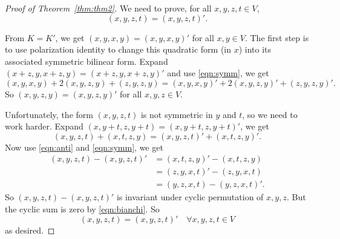 \documentclass[12pt]{article}
\begin{document}
\begin{proof}[Proof of Theorem~\ref{thm:thm2}]
We need to prove, for all $x,y,z,t\in V$,
\[
(x,y,z,t)=(x,y,z,t)'.
\]

From $K=K'$, we get $(x,y,x,y)=(x,y,x,y)'$ for all $x,y\in V$.  The first step is to use polarization identity to change this quadratic form (in $x$) into its associated symmetric bilinear form.  Expand $(x+z,y,x+z,y)=(x+z,y,x+z,y)'$ and use \eqref{eqn:symm}, we get
\[
(x,y,x,y)+2(x,y,z,y)+(z,y,z,y)=(x,y,x,y)'+2(x,y,z,y)'+(z,y,z,y)'.
\]
So $(x,y,z,y)=(x,y,z,y)'$ for all $x,y,z\in V$.

Unfortunately, the form $(x,y,z,t)$ is not symmetric in $y$ and $t$, so we need to work harder.  Expand $(x,y+t,z,y+t)=(x,y+t,z,y+t)'$, we get
\[
(x,y,z,t)+(x,t,z,y)=(x,y,z,t)'+(x,t,z,y)'.
\]
Now use \eqref{eqn:anti} and \eqref{eqn:symm}, we get
\begin{align*}
(x,y,z,t)-(x,y,z,t)'&=(x,t,z,y)'-(x,t,z,y)\\
&=(z,y,x,t)'-(z,y,x,t)\\
&=(y,z,x,t)-(y,z,x,t)'.
\end{align*}
So $(x,y,z,t)-(x,y,z,t)'$ is invariant under cyclic permutation of $x,y,z$.  But the cyclic sum is zero by \eqref{eqn:bianchi}.  So
\[
(x,y,z,t)=(x,y,z,t)'\quad\forall x,y,z,t\in V
\]
as desired.
\end{proof}
\end{document}
